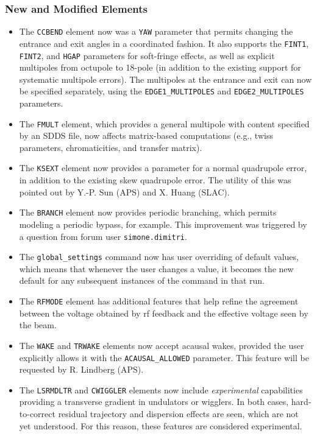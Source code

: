 \documentclass[11pt]{article}
\begin{document}
\subsubsection{New and Modified Elements}
\begin{itemize}
\item The \verb|CCBEND| element now was a \verb|YAW| parameter that permits changing the entrance and exit
  angles in a coordinated fashion. It also supports the \verb|FINT1|, \verb|FINT2|, and \verb|HGAP| parameters
  for soft-fringe effects, as well as explicit multipoles from octupole to 18-pole (in addition to the
  existing support for systematic multipole errors). The multipoles at the entrance and exit can now be
  specified separately, using the \verb|EDGE1_MULTIPOLES| and \verb|EDGE2_MULTIPOLES| parameters.
\item The \verb|FMULT| element, which provides a general multipole with content specified by an SDDS file, now
  affects matrix-based computations (e.g., twiss parameters, chromaticities, and transfer matrix).
\item The \verb|KSEXT| element now provides a parameter for a normal quadrupole error, in addition to the existing
  skew quadrupole error. The utility of this was pointed out by Y.-P. Sun (APS) and X. Huang (SLAC).
\item The \verb|BRANCH| element now provides periodic branching, which permits modeling a periodic bypass, for
  example. This improvement was triggered by a question from forum user \verb|simone.dimitri|.
\item The \verb|global_settings| command now has user overriding of default values, which means that whenever the user
  changes a value, it becomes the new default for any subsequent instances of the command in that run.
\item The \verb|RFMODE| element has additional features that help refine the agreement between the voltage obtained by 
  rf feedback and the effective voltage seen by the beam.
\item The \verb|WAKE| and \verb|TRWAKE| elements now accept acausal wakes, provided the user explicitly allows it with the 
  \verb|ACAUSAL_ALLOWED| parameter. This feature will be requested by R. Lindberg (APS).
\item The \verb|LSRMDLTR| and \verb|CWIGGLER| elements now include {\em experimental} capabilities providing a
  transverse gradient in undulators or wigglers. In both cases, hard-to-correct residual trajectory and dispersion 
  effects are seen, which are not yet understood. For this reason, these features are considered experimental.
\end{itemize}
\end{document}
